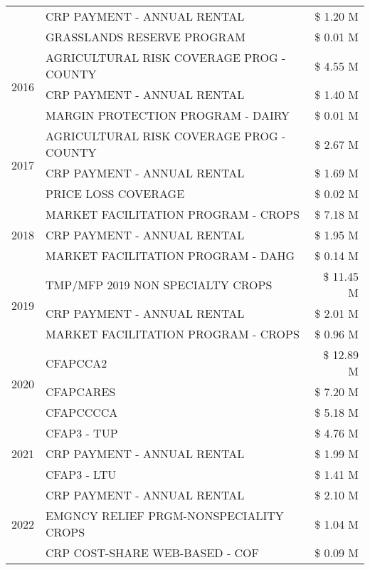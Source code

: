 \begin{tabular}{llr}
 & CRP PAYMENT - ANNUAL RENTAL & \$ 1.20 M \\
 & GRASSLANDS RESERVE PROGRAM & \$ 0.01 M \\
\cline{1-3}
\multirow[t]{3}{*}{2016} & AGRICULTURAL RISK COVERAGE PROG - COUNTY & \$ 4.55 M \\
 & CRP PAYMENT - ANNUAL RENTAL & \$ 1.40 M \\
 & MARGIN PROTECTION PROGRAM - DAIRY & \$ 0.01 M \\
\cline{1-3}
\multirow[t]{3}{*}{2017} & AGRICULTURAL RISK COVERAGE PROG - COUNTY & \$ 2.67 M \\
 & CRP PAYMENT - ANNUAL RENTAL & \$ 1.69 M \\
 & PRICE LOSS COVERAGE & \$ 0.02 M \\
\cline{1-3}
\multirow[t]{3}{*}{2018} & MARKET FACILITATION PROGRAM - CROPS & \$ 7.18 M \\
 & CRP PAYMENT - ANNUAL RENTAL & \$ 1.95 M \\
 & MARKET FACILITATION PROGRAM - DAHG & \$ 0.14 M \\
\cline{1-3}
\multirow[t]{3}{*}{2019} & TMP/MFP 2019 NON SPECIALTY CROPS & \$ 11.45 M \\
 & CRP PAYMENT - ANNUAL RENTAL & \$ 2.01 M \\
 & MARKET FACILITATION PROGRAM - CROPS & \$ 0.96 M \\
\cline{1-3}
\multirow[t]{3}{*}{2020} & CFAPCCA2 & \$ 12.89 M \\
 & CFAPCARES & \$ 7.20 M \\
 & CFAPCCCCA & \$ 5.18 M \\
\cline{1-3}
\multirow[t]{3}{*}{2021} & CFAP3 - TUP & \$ 4.76 M \\
 & CRP PAYMENT - ANNUAL RENTAL & \$ 1.99 M \\
 & CFAP3 - LTU & \$ 1.41 M \\
\cline{1-3}
\multirow[t]{3}{*}{2022} & CRP PAYMENT - ANNUAL RENTAL & \$ 2.10 M \\
 & EMGNCY RELIEF PRGM-NONSPECIALITY CROPS & \$ 1.04 M \\
 & CRP COST-SHARE WEB-BASED - COF & \$ 0.09 M \\
\cline{1-3}
\bottomrule
\end{tabular}
